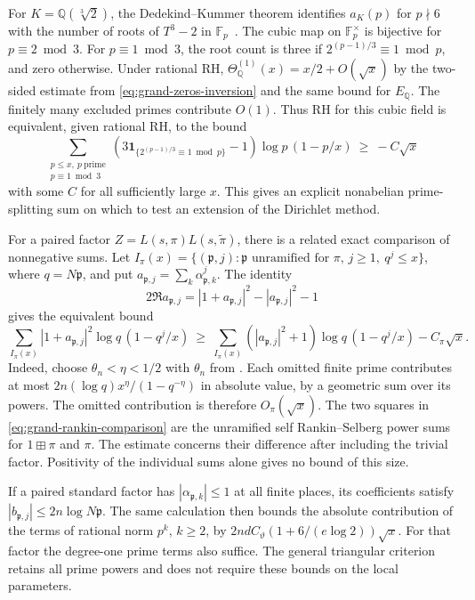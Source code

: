 \documentclass[11pt]{amsart}
\theoremstyle{definition}
\theoremstyle{remark}
\numberwithin{equation}{section}
\begin{document}
For \(K=\mathbb Q(\sqrt[3]{2})\), the Dedekind--Kummer theorem
identifies \(a_K(p)\) for \(p\nmid 6\) with the number of roots of
\(T^3-2\) in \(\mathbb F_p\)~\cite[Theorem~2.1]{SutherlandArithmeticEquivalence}.
The cubic map on \(\mathbb F_p^\times\) is bijective for
\(p\equiv2\bmod 3\). For \(p\equiv1\bmod 3\), the root count is
three if \(2^{(p-1)/3}\equiv1\bmod p\), and zero otherwise.
Under rational RH,
\(\Theta_{\mathbb Q}^{(1)}(x)=x/2+O(\sqrt{x})\) by the
two-sided estimate from \eqref{eq:grand-zeros-inversion} and the
same bound for \(E_{\mathbb Q}\).
The finitely many excluded primes contribute \(O(1)\).
Thus RH for this cubic field is equivalent, given rational RH,
to the bound
\[
 \sum_{\substack{p\le x,\ p\ \mathrm{prime}\\ p\equiv1\bmod 3}}
  \left(3\mathbf 1_{\{2^{(p-1)/3}\equiv1\bmod p\}}-1\right)
  \log p\,(1-p/x) \ \geq\ -C\sqrt{x}
\]
with some \(C\) for all sufficiently large \(x\). This gives
an explicit nonabelian prime-splitting sum on which to test an
extension of the Dirichlet method.

For a paired factor \(Z=L(s,\pi)L(s,\widetilde\pi)\), there is a
related exact comparison of nonnegative sums. Let
\(I_\pi(x)=\{(\mathfrak p,j):\mathfrak p\text{ unramified for }\pi,\,
j\ge1,\ q^j\le x\}\), where \(q=N\mathfrak p\), and put
\(a_{\mathfrak p,j}=\sum_k\alpha_{\mathfrak p,k}^j\).
The identity
\[
 2\Re a_{\mathfrak p,j}
  = |1+a_{\mathfrak p,j}|^2-|a_{\mathfrak p,j}|^2-1
\]
gives the equivalent bound
\begin{equation}\label{eq:grand-rankin-comparison}
 \sum_{I_\pi(x)} |1+a_{\mathfrak p,j}|^2
                \log q\,(1-q^j/x)
 \ \geq\
 \sum_{I_\pi(x)} (|a_{\mathfrak p,j}|^2+1)
                \log q\,(1-q^j/x)-C_\pi\sqrt{x}.
\end{equation}
Indeed, choose \(\theta_n<\eta<1/2\) with \(\theta_n\) from
\cite[(2.2)]{ThornerZhaoRankinSelberg}. Each omitted finite prime
contributes at most \(2n(\log q)x^\eta/(1-q^{-\eta})\) in
absolute value, by a geometric sum over its powers. The
omitted contribution is therefore \(O_\pi(\sqrt{x})\).
The two squares in \eqref{eq:grand-rankin-comparison}
are the unramified self Rankin--Selberg power sums for
\(1\boxplus\pi\) and \(\pi\). The estimate concerns their difference
after including the trivial factor. Positivity of the individual
sums alone gives no bound of this size.

If a paired standard factor has \(|\alpha_{\mathfrak p,k}|\le1\)
at all finite places, its coefficients satisfy
\(|b_{\mathfrak p,j}|\le2n\log N\mathfrak p\).
The same calculation then bounds the absolute contribution of
the terms of rational norm \(p^k\), \(k\ge2\), by
\(2nd C_\vartheta(1+6/(e\log 2))\sqrt{x}\).
For that factor the degree-one prime terms also suffice.
The general triangular criterion retains all prime powers and
does not require these bounds on the local parameters.
\end{document}
